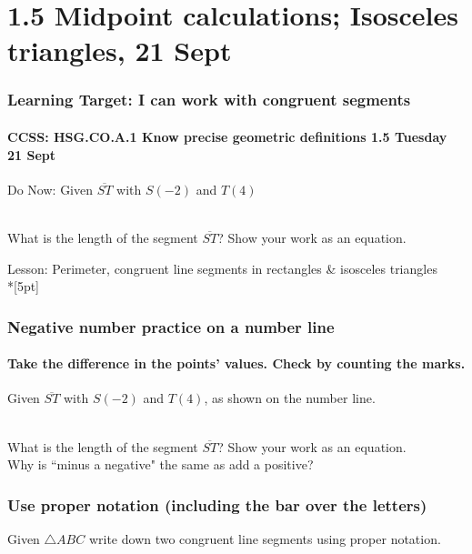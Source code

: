 \documentclass{beamer}
\begin{document}
  \section{1.5 Midpoint calculations; Isosceles triangles, 21 Sept}
  \frame
  {
    \frametitle{Learning Target: I can work with congruent segments}
    \framesubtitle{CCSS: HSG.CO.A.1 Know precise geometric definitions  \hfill \alert{1.5 Tuesday 21 Sept}}
  
    \begin{block}{Do Now: Given $\overline{ST}$ with $S(-2)$ and $T(4)$}
       \\ \bigskip
  What is the length of the segment $\overline{ST}$? Show your work as an equation.
    \end{block}
    Lesson: Perimeter, congruent line segments in rectangles \& isosceles triangles \\*[5pt]
  }

  \frame
  {
    \frametitle{Negative number practice on a number line}
    \framesubtitle{Take the difference in the points' values. Check by counting the marks.}
    Given $\overline{ST}$ with $S(-2)$ and $T(4)$, as shown on the number line. \\[0.25cm]
       \\ \bigskip
  What is the length of the segment $\overline{ST}$? Show your work as an equation.\\[1.5cm]
  Why is ``minus a negative" the same as add a positive? \vspace{2cm}  
  }

  \frame
  {
    \frametitle{Use proper notation (including the bar over the letters)}
      Given $\triangle ABC$ write down two congruent line segments using proper notation.\\
  }
\end{document}

